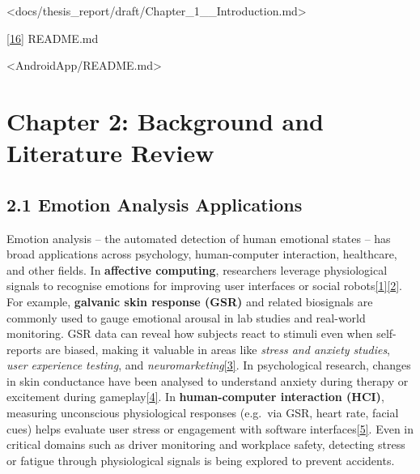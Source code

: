 \documentclass[12pt,a4paper]{article}
\begin{document}
\textless docs/thesis\_report/draft/Chapter\_1\_\_Introduction.md\textgreater{}

\href{AndroidApp/README.md\#L2-L5}{{[}16{]}} README.md

\textless AndroidApp/README.md\textgreater{}

\newpage

\section{Chapter 2: Background and Literature Review}\label{chapter-2-background-and-literature-review}

\subsection{2.1 Emotion Analysis Applications}\label{emotion-analysis-applications}

Emotion analysis -- the automated detection of human emotional states -- has broad applications across psychology, human-computer interaction, healthcare, and other fields. In \textbf{affective computing}, researchers leverage physiological signals to recognise emotions for improving user interfaces or social robots\href{https://www.mdpi.com/2076-3417/10/8/2924\#:~:text=primarily\%20use\%20visual\%20information\%20for,it\%20might\%20be\%20possible\%20to}{{[}1{]}}\href{https://www.mdpi.com/2076-3417/10/8/2924\#:~:text=such\%20as\%20those\%20that\%20can,affective\%20computing\%20for\%20human\%E2\%80\%93robot\%20interaction}{{[}2{]}}. For example, \textbf{galvanic skin response (GSR)} and related biosignals are commonly used to gauge emotional arousal in lab studies and real-world monitoring. GSR data can reveal how subjects react to stimuli even when self-reports are biased, making it valuable in areas like \emph{stress and anxiety studies}, \emph{user experience testing}, and \emph{neuromarketing}\href{Boucsein2012}{{[}3{]}}. In psychological research, changes in skin conductance have been analysed to understand anxiety during therapy or excitement during gameplay\href{Boucsein2012}{{[}4{]}}. In \textbf{human-computer interaction (HCI)}, measuring unconscious physiological responses (e.g.~via GSR, heart rate, facial cues) helps evaluate user stress or engagement with software interfaces\href{Boucsein2012}{{[}5{]}}. Even in critical domains such as driver monitoring and workplace safety, detecting stress or fatigue through physiological signals is being explored to prevent accidents.
\end{document}
